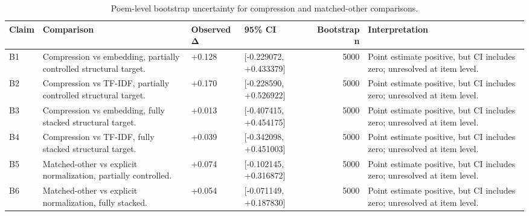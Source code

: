 \begin{table}
\caption{Poem-level bootstrap uncertainty for compression and matched-other comparisons.}
\label{tab:table_2_bootstrap_uncertainty}
\begin{tabular}{llllrl}
\toprule
Claim & Comparison & Observed Δ & 95\% CI & Bootstrap n & Interpretation \\
\midrule
B1 & Compression vs embedding, partially controlled structural target. & +0.128 & [-0.229072, +0.433379] & 5000 & Point estimate positive, but CI includes zero; unresolved at item level. \\
B2 & Compression vs TF-IDF, partially controlled structural target. & +0.170 & [-0.228590, +0.526922] & 5000 & Point estimate positive, but CI includes zero; unresolved at item level. \\
B3 & Compression vs embedding, fully stacked structural target. & +0.013 & [-0.407415, +0.454175] & 5000 & Point estimate positive, but CI includes zero; unresolved at item level. \\
B4 & Compression vs TF-IDF, fully stacked structural target. & +0.039 & [-0.342098, +0.451003] & 5000 & Point estimate positive, but CI includes zero; unresolved at item level. \\
B5 & Matched-other vs explicit normalization, partially controlled. & +0.074 & [-0.102145, +0.316872] & 5000 & Point estimate positive, but CI includes zero; unresolved at item level. \\
B6 & Matched-other vs explicit normalization, fully stacked. & +0.054 & [-0.071149, +0.187830] & 5000 & Point estimate positive, but CI includes zero; unresolved at item level. \\
\bottomrule
\end{tabular}
\end{table}
